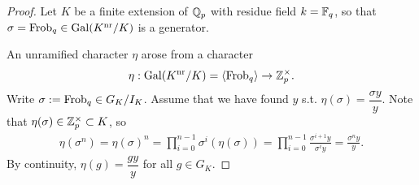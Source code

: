 \begin{proof}
    Let $K$ be a finite extension of $\mathbb{Q}_p$ with residue field $k = \mathbb{F}_q$, so that
    $\sigma = \operatorname{Frob}_q\in\operatorname{Gal}(K^{\mathrm{nr}}/K)$ is a generator.




    An unramified character $\eta$ arose from a character \[\eta:\operatorname{Gal}(K^{\mathrm{nr}}/K) = \left\langle \operatorname{Frob}_q \right\rangle\to\mathbb{Z}_p^\times.\]
    Write $\sigma := \operatorname{Frob}_q\in G_K/I_K$.
    Assume that we have found $y$ s.t. $\eta(\sigma) = \dfrac{\sigma y}{y}$.
    Note that $\eta(\sigma)\in \mathbb{Z}_p^\times\subset K$,
    so \begin{align*}
        \eta(\sigma^n) = \eta(\sigma)^n
        = \prod_{i=0}^{n-1}\sigma^{i}(\eta(\sigma))
        = \prod_{i=0}^{n-1}\frac{\sigma^{i+1}y }{\sigma^i y}
        = \frac{\sigma^n y }{y }.
    \end{align*}
    By continuity, $\eta(g) = \dfrac{gy }{y}$ for all $g\in G_K$.


\end{proof}
